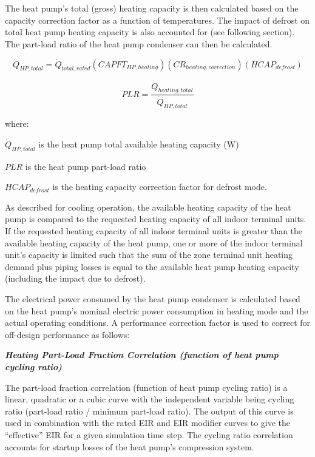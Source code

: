 The heat pump's total (gross) heating capacity is then calculated based on the capacity correction factor as a function of temperatures. The impact of defrost on total heat pump heating capacity is also accounted for (see following section). The part-load ratio of the heat pump condenser can then be calculated.

\begin{equation}
  \dot{Q}_{HP,total} = \dot{Q}_{total,rated} \left( CAPFT_{HP,heating} \right) \left( CR_{heating,correction} \right) \left( HCAP_{defrost} \right)
\end{equation}

\begin{equation}
  PLR = \frac{\dot{Q}_{heating,total}}{\dot{Q}_{HP,total}}
\end{equation}

where:

\(\dot{Q}_{HP,total}\) is the heat pump total available heating capacity (W)

\(PLR\) is the heat pump part-load ratio

\(HCAP_{defrost}\) is the heating capacity correction factor for defrost mode.

As described for cooling operation, the available heating capacity of the heat pump is compared to the requested heating capacity of all indoor terminal units. If the requested heating capacity of all indoor terminal units is greater than the available heating capacity of the heat pump, one or more of the indoor terminal unit's capacity is limited such that the sum of the zone terminal unit heating demand plus piping losses is equal to the available heat pump heating capacity (including the impact due to defrost).

The electrical power consumed by the heat pump condenser is calculated based on the heat pump's nominal electric power consumption in heating mode and the actual operating conditions. A performance correction factor is used to correct for off-design performance as follows:

\emph{\textbf{Heating Part-Load Fraction Correlation (function of heat pump cycling ratio)}}

The part-load fraction correlation (function of heat pump cycling ratio) is a linear, quadratic or a cubic curve with the independent variable being cycling ratio (part-load ratio / minimum part-load ratio). The output of this curve is used in combination with the rated EIR and EIR modifier curves to give the ``effective'' EIR for a given simulation time step. The cycling ratio correlation accounts for startup losses of the heat pump's compression system.

